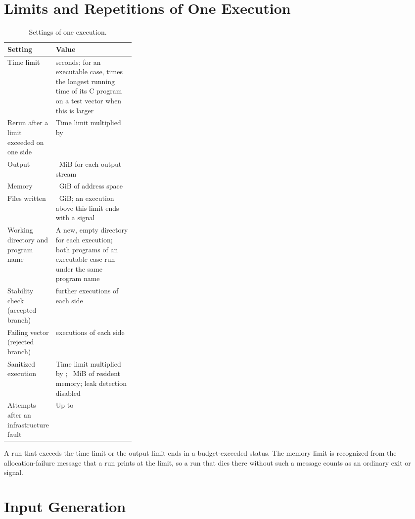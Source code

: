 \section{Limits and Repetitions of One Execution}\label{app:s-limits}

\begin{table}[!htb]
\centering
\small
\renewcommand{\arraystretch}{1.2}
\caption{Settings of one execution.}
\label{tab:app-limits}
\begin{tabularx}{\linewidth}{@{}>{\raggedright\arraybackslash}p{0.30\linewidth}>{\raggedright\arraybackslash}X@{}}
\toprule
Setting & Value \\
\midrule
Time limit & \pTimeoutSec{} seconds; for an executable case, \pCTimeFactor{} times the longest running time of its C program on a test vector when this is larger \\
Rerun after a limit exceeded on one side & Time limit multiplied by \pRerunFactor{} \\
Output & \pOutputCapMiB{}~MiB for each output stream \\
Memory & \pMemLimitGiB{}~GiB of address space \\
Files written & \pFsizeLimitGiB{}~GiB; an execution above this limit ends with a signal \\
Working directory and program name & A new, empty directory for each execution; both programs of an executable case run under the same program name \\
Stability check (accepted branch) & \pStabReps{} further executions of each side \\
Failing vector (rejected branch) & \pRqTwoReps{} executions of each side \\
Sanitized execution & Time limit multiplied by \pSanTimeoutFactor{}; \pSanRssMiB{}~MiB of resident memory; leak detection disabled \\
Attempts after an infrastructure fault & Up to \pInfraAttempts{} \\
\bottomrule
\end{tabularx}
\end{table}

A run that exceeds the time limit or the output limit ends in a budget-exceeded status. The memory limit is recognized from the allocation-failure message that a run prints at the limit, so a run that dies there without such a message counts as an ordinary exit or signal.

\section{Input Generation}\label{app:s-inputs}

